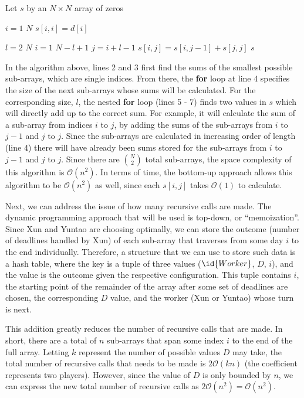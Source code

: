 \begin{spacing}{1.2}
    \begin{codebox}
        \li Let $s$ by an $N \times N$ array of zeros

        \li \For $i = 1$ \To $N$
        \Do
        \li $s[i, i] = d[i]$
        \End

        \li \For $l = 2$ \To $N$
        \Do
        \li \For $i = 1$ \To $N - l + 1$
        \Do
        \li $j = i + l - 1$
        \li $s[i, j] = s[i, j - 1] + s[j, j]$
        \End
        \End
        \li \Return $s$
    \end{codebox}
\end{spacing}
\vspace{5mm}
In the algorithm above, lines 2 and 3 first find the sums of the smallest possible sub-arrays, which are single indices.
From there, the \textbf{for} loop at line 4 specifies the size of the next sub-arrays whose sums will be calculated.
For the corresponding size, $l$, the nested \textbf{for} loop (lines 5 - 7) finds two values in $s$ which will directly add up to the correct sum.
For example, it will calculate the sum of a sub-array from indices $i$ to $j$, by adding the sums of the sub-arrays from $i$ to $j - 1$ and $j$ to $j$.
Since the sub-arrays are calculated in increasing order of length (line 4) there will have already been sums stored for the sub-arrays from $i$ to $j - 1$ and $j$ to $j$.
Since there are $\binom{N}{2}$ total sub-arrays, the space complexity of this algorithm is $\mathcal{O}(n^2)$.
In terms of time, the bottom-up approach allows this algorithm to be $\mathcal{O}(n^2)$ as well, since each $s[i, j]$ takes $\mathcal{O}(1)$ to calculate.

Next, we can address the issue of how many recursive calls are made.
The dynamic programming approach that will be used is top-down, or ``memoization''.
Since Xun and Yuntao are choosing optimally, we can store the outcome (number of deadlines handled by Xun) of each sub-array that traverses from some day $i$ to the end individually.
Therefore, a structure that we can use to store such data is a hash table, where the key is a tuple of three values ($\id{Worker}$, $D$, $i$), and the value is the outcome given the respective configuration.
This tuple contains $i$, the starting point of the remainder of the array after some set of deadlines are chosen, the corresponding $D$ value, and the worker (Xun or Yuntao) whose turn is next.

This addition greatly reduces the number of recursive calls that are made.
In short, there are a total of $n$ sub-arrays that span some index $i$ to the end of the full array.
Letting $k$ represent the number of possible values $D$ may take, the total number of recursive calls that needs to be made is $2\mathcal{O}(kn)$ (the coefficient represents two players).
However, since the value of $D$ is only bounded by $n$, we can express the new total number of recursive calls as $2\mathcal{O}(n^2) = \mathcal{O}(n^2)$.

